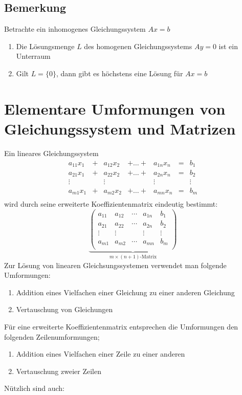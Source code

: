 \subsection{Bemerkung}
Betrachte ein inhomogenes Gleichungssystem \(Ax=b\)
\begin{enumerate}
\item Die Lösungsmenge \(L\) des homogenen Gleichungssystems \(Ay=0\) ist ein Unterraum
\item Gilt \(L=\{0\} \), dann gibt es höchstens eine Lösung für \(Ax=b\)
\end{enumerate}
\section{Elementare Umformungen von Gleichungssystem und Matrizen}
Ein lineares Gleichungssystem 
\[
\begin{matrix}
a_{11} x_1 & + & a_{12} x_2 & +  \ldots  + & a_{1n} x_n & = & b_1 \\
a_{21} x_1 & + & a_{22} x_2 & +  \ldots  + & a_{2n} x_n & = & b_2 \\
\vdots &  & \vdots &    & \vdots &  & \vdots \\
a_{m1} x_1 & + & a_{m2} x_2 & +  \ldots  + & a_{mn} x_n & = & b_m \\
\end{matrix}
\]
wird durch seine erweiterte Koeffizientenmatrix eindeutig bestimmt:
\[
\underbrace{\begin{pmatrix}
a_{11} & a_{12} & \cdots & a_{1n} & b_1\\
a_{21} & a_{22} & \cdots & a_{2n} &  b_2\\
\vdots & \vdots &  & \vdots & \vdots\\
a_{m1} & a_{m2} & \cdots & a_{mn} & b_m\\
\end{pmatrix}}_{m \times (n+1)\text{-Matrix}}
\]
Zur Lösung von linearen Gleichsungssystemen verwendet man folgende Umformungen:
\renewcommand{\labelenumi}{\Roman{enumi}.}
\begin{enumerate}
\item Addition eines Vielfachen einer Gleichung zu einer anderen Gleichung
\item Vertauschung von Gleichungen
\end{enumerate}
Für eine erweiterte Koeffizientenmatrix entsprechen die Umformungen den folgenden Zeilenumformungen;
\begin{enumerate}
\item Addition eines Vielfachen einer Zeile zu einer anderen
\item Vertauschung zweier Zeilen
\end{enumerate}
Nützlich sind auch:

